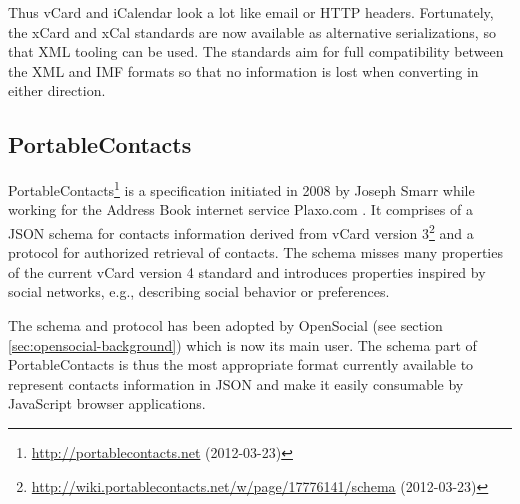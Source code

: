 \documentclass[11pt,a4paper,headsepline,twoside]{scrartcl}		%
\newcommand{\citeurl}[2]{\url{#1} (#2)}
\begin{document}
Thus vCard and iCalendar look a lot like email or HTTP headers. Fortunately, the
xCard \cite{RFC6351} and xCal \cite{RFC6321} standards are now available as
alternative serializations, so that XML tooling can be used. The standards aim
for full compatibility between the XML and IMF formats so that no information is
lost when converting in either direction.



\subsection{PortableContacts}
\label{sec:portablecontacts}

PortableContacts\footnote{\citeurl{http://portablecontacts.net}{2012-03-23}} is
a specification initiated in 2008 by Joseph Smarr while working for the Address
Book internet service
Plaxo.com \cite{Smarr2008}. It
comprises of a JSON schema for contacts information derived from vCard version
3\footnote{\citeurl{http://wiki.portablecontacts.net/w/page/17776141/schema}{2012-03-23}}
and a protocol for authorized retrieval of contacts. The schema misses many
properties of the current vCard version 4 standard \cite{RFC6350} and introduces
properties inspired by social networks, e.g., describing social behavior or
preferences.

The schema and protocol has been adopted by OpenSocial (see section
\ref{sec:opensocial-background}) which is now its main user. The schema part of
PortableContacts is thus the most appropriate format currently available to
represent contacts information in JSON and make it easily consumable by
JavaScript browser applications.
\end{document}
